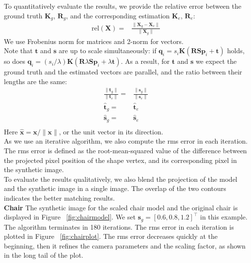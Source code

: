 \documentclass[10pt,twocolumn,letterpaper]{article}
\begin{document}
\noindent
To quantitatively evaluate the results, we provide the relative error between the ground truth $\mathbf{K}_g$, $\mathbf{R}_g$, and the corresponding estimation $\mathbf{K}_e$, $\mathbf{R}_e$:
\begin{equation}
\begin{split}
\textrm{rel}(\mathbf{X})=&\frac{\|\mathbf{X}_g-\mathbf{X}_e\|}{\|\mathbf{X}_g\|}
\end{split}
\end{equation}
We use Frobenius norm for matrices and 2-norm for vectors.\\

\noindent
Note that $\mathbf{t}$ and $\mathbf{s}$ are up to scale simultaneously: if $\mathbf{q}_i=s_i\mathbf{K}(\mathbf{R}\mathbf{S}\mathbf{p}_i + \mathbf{t})$ holds, so does $\mathbf{q}_i=(s_i/\lambda)\mathbf{K}(\mathbf{R}\lambda\mathbf{S}\mathbf{p}_i + \lambda\mathbf{t})$. As a result, for $\mathbf{t}$ and $\mathbf{s}$ we expect the ground truth and the estimated vectors are parallel, and the ratio between their lengths are the same:
\begin{equation}
\begin{split}
\frac{\|\mathbf{t}_g\|}{\|\mathbf{t}_e\|}=&\frac{\|\mathbf{s}_g\|}{\|\mathbf{s}_e\|}\\
\hat{\mathbf{t}}_g=&\hat{\mathbf{t}}_e\\
\hat{\mathbf{s}}_g=&\hat{\mathbf{s}}_e\\
\end{split}
\end{equation}
Here $\hat{\mathbf{x}}=\mathbf{x}/\|\mathbf{x}\|$, or the unit vector in its direction.\\

\noindent
As we use an iterative algorithm, we also compute the rms error in each iteration. The rms error is defined as the root-mean-squared value of the difference between the projected pixel position of the shape vertex, and its corresponding pixel in the synthetic image.\\

\noindent
To evaluate the results qualitatively, we also blend the projection of the model and the synthetic image in a single image. The overlap of the two contours indicates the better matching results.\\

\noindent
\textbf{Chair} The synthetic image for the scaled chair model and the original chair is displayed in Figure ~\ref{fig:chairmodel}. We set $\mathbf{s}_g=[0.6, 0.8, 1.2]^\top$ in this example. The algorithm terminates in 180 iterations. The rms error in each iteration is plotted in Figure ~\ref{fig:chairplot}. The rms error decreases quickly at the beginning, then it refines the camera parameters and the scaling factor, as shown in the long tail of the plot.\\
\end{document}

